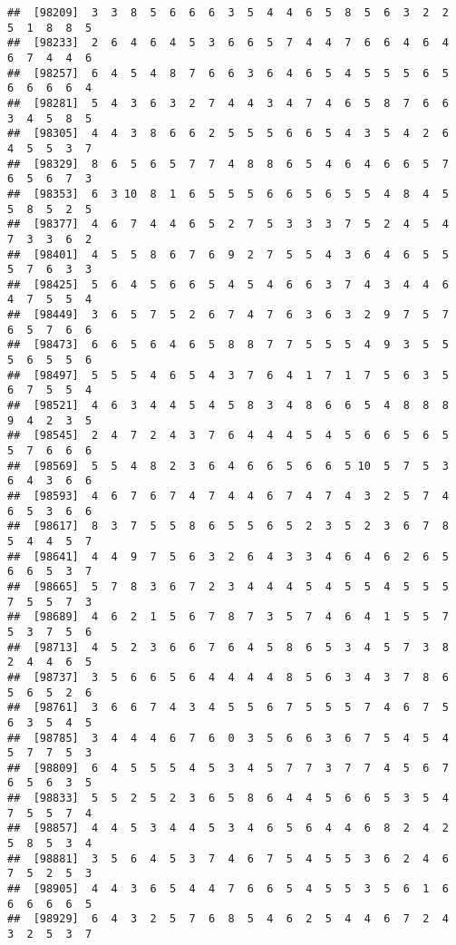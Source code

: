 \documentclass[
]{book}
\begin{document}
\begin{verbatim}
##  [98209]  3  3  8  5  6  6  6  3  5  4  4  6  5  8  5  6  3  2  2  5  1  8  8  5
##  [98233]  2  6  4  6  4  5  3  6  6  5  7  4  4  7  6  6  4  6  4  6  7  4  4  6
##  [98257]  6  4  5  4  8  7  6  6  3  6  4  6  5  4  5  5  5  6  5  6  6  6  6  4
##  [98281]  5  4  3  6  3  2  7  4  4  3  4  7  4  6  5  8  7  6  6  3  4  5  8  5
##  [98305]  4  4  3  8  6  6  2  5  5  5  6  6  5  4  3  5  4  2  6  4  5  5  3  7
##  [98329]  8  6  5  6  5  7  7  4  8  8  6  5  4  6  4  6  6  5  7  6  5  6  7  3
##  [98353]  6  3 10  8  1  6  5  5  5  6  6  5  6  5  5  4  8  4  5  5  8  5  2  5
##  [98377]  4  6  7  4  4  6  5  2  7  5  3  3  3  7  5  2  4  5  4  7  3  3  6  2
##  [98401]  4  5  5  8  6  7  6  9  2  7  5  5  4  3  6  4  6  5  5  5  7  6  3  3
##  [98425]  5  6  4  5  6  6  5  4  5  4  6  6  3  7  4  3  4  4  6  4  7  5  5  4
##  [98449]  3  6  5  7  5  2  6  7  4  7  6  3  6  3  2  9  7  5  7  6  5  7  6  6
##  [98473]  6  6  5  6  4  6  5  8  8  7  7  5  5  5  4  9  3  5  5  5  6  5  5  6
##  [98497]  5  5  5  4  6  5  4  3  7  6  4  1  7  1  7  5  6  3  5  6  7  5  5  4
##  [98521]  4  6  3  4  4  5  4  5  8  3  4  8  6  6  5  4  8  8  8  9  4  2  3  5
##  [98545]  2  4  7  2  4  3  7  6  4  4  4  5  4  5  6  6  5  6  5  5  7  6  6  6
##  [98569]  5  5  4  8  2  3  6  4  6  6  5  6  6  5 10  5  7  5  3  6  4  3  6  6
##  [98593]  4  6  7  6  7  4  7  4  4  6  7  4  7  4  3  2  5  7  4  6  5  3  6  6
##  [98617]  8  3  7  5  5  8  6  5  5  6  5  2  3  5  2  3  6  7  8  5  4  4  5  7
##  [98641]  4  4  9  7  5  6  3  2  6  4  3  3  4  6  4  6  2  6  5  6  6  5  3  7
##  [98665]  5  7  8  3  6  7  2  3  4  4  4  5  4  5  5  4  5  5  5  7  5  5  7  3
##  [98689]  4  6  2  1  5  6  7  8  7  3  5  7  4  6  4  1  5  5  7  5  3  7  5  6
##  [98713]  4  5  2  3  6  6  7  6  4  5  8  6  5  3  4  5  7  3  8  2  4  4  6  5
##  [98737]  3  5  6  6  5  6  4  4  4  4  8  5  6  3  4  3  7  8  6  5  6  5  2  6
##  [98761]  3  6  6  7  4  3  4  5  5  6  7  5  5  5  7  4  6  7  5  6  3  5  4  5
##  [98785]  3  4  4  4  6  7  6  0  3  5  6  6  3  6  7  5  4  5  4  5  7  7  5  3
##  [98809]  6  4  5  5  5  4  5  3  4  5  7  7  3  7  7  4  5  6  7  6  5  6  3  5
##  [98833]  5  5  2  5  2  3  6  5  8  6  4  4  5  6  6  5  3  5  4  7  5  5  7  4
##  [98857]  4  4  5  3  4  4  5  3  4  6  5  6  4  4  6  8  2  4  2  5  8  5  3  4
##  [98881]  3  5  6  4  5  3  7  4  6  7  5  4  5  5  3  6  2  4  6  7  5  2  5  3
##  [98905]  4  4  3  6  5  4  4  7  6  6  5  4  5  5  3  5  6  1  6  6  6  6  6  5
##  [98929]  6  4  3  2  5  7  6  8  5  4  6  2  5  4  4  6  7  2  4  3  2  5  3  7

\end{verbatim}
\end{document}
